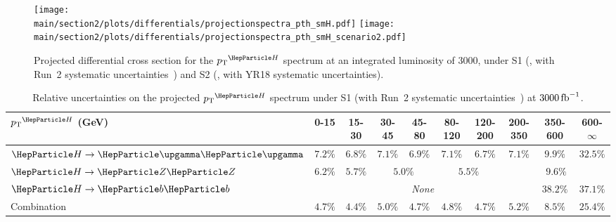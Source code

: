 \begin{figure}[hbtp]
  \begin{center}
    \texttt{[image: \\main/section2/plots/differentials/projectionspectra\_pth\_smH.pdf]}
    \texttt{[image: \\main/section2/plots/differentials/projectionspectra\_pth\_smH\_scenario2.pdf]}
    \caption{
        Projected differential cross section for the $\pTH$ spectrum at an integrated luminosity of 3000\fbinv, under S1 (\UcmsLeft, with Run~2 systematic uncertainties~\cite{CMS-PAS-HIG-17-028}) and S2 (\UcmsRight, with YR18 systematic uncertainties).
        }
    \label{fig:proj_pth}
  \end{center}
\end{figure}

\begin{table}[htb]
\footnotesize
\begin{center}
\begin{tabular}{l|c|c|c|c|c|c|c|c|c}
$\pTH$ (GeV)       & 0-15    &  15-30   &  30-45    &  45-80   &  80-120  &  120-200  &  200-350  &  350-600  &  600-$\infty$  \\
\hline
$\hgg$       & $7.2\%$ & $6.8\%$ & $7.1\%$ & $6.9\%$            & $7.1\%$ & $6.7\%$            & $7.1\%$ & $9.9\%$  & $32.5\%$ \\ 
$\hzz$       & $6.2\%$ & $5.7\%$ & \multicolumn{2}{c|}{$5.0\%$} & \multicolumn{2}{c|}{$5.5\%$} & \multicolumn{3}{c}{$9.6\%$} \\ 
$\hbb$       & \multicolumn{7}{c|}{\textit{None}}                                              & $38.2\%$ & $37.1\%$ \\ 
Combination  & $4.7\%$ & $4.4\%$ & $5.0\%$ & $4.7\%$            & $4.8\%$ & $4.7\%$            & $5.2\%$ & $8.5\%$  & $25.4\%$ \\
\end{tabular}
\end{center}
\caption{
    Relative uncertainties on the projected $\pTH$ spectrum under S1 (with Run~2 systematic uncertainties~\cite{CMS-PAS-HIG-17-028}) at $3000\mbox{\ensuremath{\,\text{fb}^\text{$-$1}}}$.
    }
\label{tab:proj_pth_unc_scen1}
\end{table}

